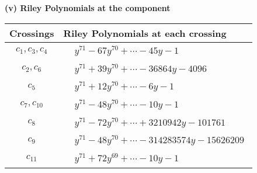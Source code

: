 \documentclass[1p]{elsarticle_modified}
\theoremstyle{definition}
\begin{document}
\flushleft \textbf{(v) Riley Polynomials at the component}\newline \\
\begin{tabular}{m{50pt}|m{274pt}}
Crossings & \hspace{64pt}Riley Polynomials at each crossing \\
\hline $$\begin{aligned}c_{1},c_{3},c_{4}\end{aligned}$$&$\begin{aligned}
&y^{71}-67 y^{70}+\cdots-45 y-1
\end{aligned}$\\
\hline $$\begin{aligned}c_{2},c_{6}\end{aligned}$$&$\begin{aligned}
&y^{71}+39 y^{70}+\cdots-36864 y-4096
\end{aligned}$\\
\hline $$\begin{aligned}c_{5}\end{aligned}$$&$\begin{aligned}
&y^{71}+12 y^{70}+\cdots-6 y-1
\end{aligned}$\\
\hline $$\begin{aligned}c_{7},c_{10}\end{aligned}$$&$\begin{aligned}
&y^{71}-48 y^{70}+\cdots-10 y-1
\end{aligned}$\\
\hline $$\begin{aligned}c_{8}\end{aligned}$$&$\begin{aligned}
&y^{71}-72 y^{70}+\cdots+3210942 y-101761
\end{aligned}$\\
\hline $$\begin{aligned}c_{9}\end{aligned}$$&$\begin{aligned}
&y^{71}-48 y^{70}+\cdots-314283574 y-15626209
\end{aligned}$\\
\hline $$\begin{aligned}c_{11}\end{aligned}$$&$\begin{aligned}
&y^{71}+72 y^{69}+\cdots-10 y-1
\end{aligned}$\\
\hline
\end{tabular}\\~\\
\end{document}
